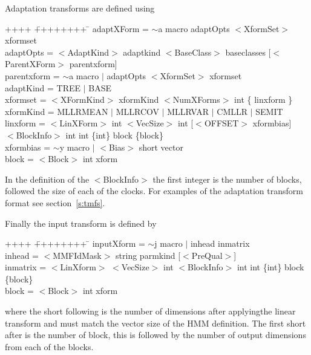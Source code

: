 Adaptation transforms are defined using
{\sf
\begin{tabbing}
++++ \= ++++++++ \=  \kill
\>  adaptXForm  = \> $\sim$a macro adaptOpts $<$XformSet$>$ xformset \\
\>  adaptOpts   = \> $<$AdaptKind$>$ adaptkind $<$BaseClass$>$ baseclasses [$<$ParentXForm$>$ parentxform]  \\
\>  parentxform = \> $\sim$a macro $|$ adaptOpts $<$XformSet$>$ xformset\\
\>  adaptKind   = \> TREE $|$ BASE\\
\>  xformset    = \> $<$XFormKind$>$ xformKind $<$NumXForms$>$ int \{ linxform \}\\
\>  xformKind   = \> MLLRMEAN $|$ MLLRCOV $|$ MLLRVAR $|$ CMLLR $|$ SEMIT\\
\>  linxform    = \> $<$LinXForm$>$ int $<$VecSize$>$ int [$<$OFFSET$>$ xformbias] \\
\>                \> $<$BlockInfo$>$ 
int int \{int\} block \{block\}\\
\>  xformbias = \> $\sim$y macro $|$ $<$Bias$>$ short vector \\
\>  block       = \> $<$Block$>$ int xform\\
\end{tabbing}
}
\noindent
In the definition of the $<$BlockInfo$>$ the first integer is the number of blocks,
followed the size of each of the clocks. For examples of the adaptation transform
format see section~\ref{s:tmfs}.

Finally the input transform is defined by
{\sf
\begin{tabbing}
++++ \= ++++++++ \=  \kill
\>  inputXform  = \> $\sim$j macro $|$ inhead inmatrix\\
\>  inhead      = \> $<$MMFIdMask$>$ string parmkind [$<$PreQual$>$]\\
\>  inmatrix    = \> $<$LinXform$>$ $<$VecSize$>$ int $<$BlockInfo$>$ 
int int \{int\} block \{block\}\\
\>  block       = \> $<$Block$>$ int xform
\end{tabbing}
}
\noindent
where the {\sf short} following  is the number of dimensions
after applyingthe linear transform and must match the vector size
of the HMM definition. The first {\sf short} after 
is the number of block, this is followed by the number of output
dimensions from each of the blocks.


